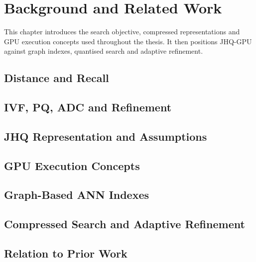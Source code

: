 \chapter{Background and Related Work}
\label{ch:background}

This chapter introduces the search objective, compressed representations
and GPU execution concepts used throughout the thesis. It then positions
JHQ-GPU against graph indexes, quantised search and adaptive refinement.


\section{Distance and Recall}
\label{sec:2-1}


\section{IVF, PQ, ADC and Refinement}
\label{sec:2-2}


\section{JHQ Representation and Assumptions}
\label{sec:2-3}


\section{GPU Execution Concepts}
\label{sec:2-4}


\section{Graph-Based ANN Indexes}
\label{sec:2-5}


\section{Compressed Search and Adaptive Refinement}
\label{sec:2-6}


\section{Relation to Prior Work}
\label{sec:2-7}

